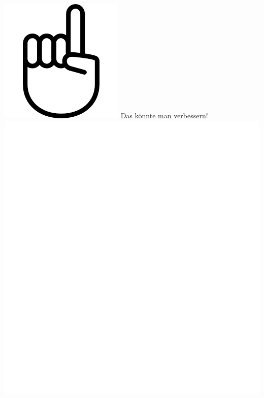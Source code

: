 \documentclass[oneside,openany,headings=optiontotoc,11pt,numbers=noenddot]{scrreprt}
\begin{document}
	\begin{framed}
		\noindent
		\includegraphics[scale=0.1]{fing.png} \tiny{\color{codegray}Das könnte man verbessern!}\\
		\includegraphics[scale=0.15]{empty.jpg}
	\end{framed}
\end{document}
